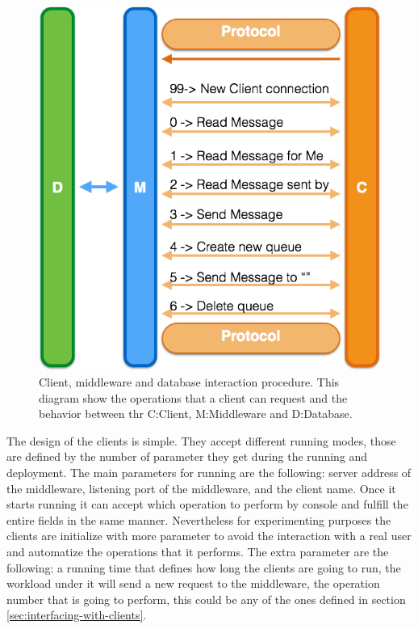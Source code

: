 \begin{figure}[h!]
	\centering
	\includegraphics[scale=0.3]{prtocol.png}
	\caption{Client, middleware and database interaction procedure. This diagram show the operations that a client can request and the behavior between thr C:Client, M:Middleware and D:Database.}
	\label{interaction}
\end{figure}
The design of the clients is simple. They accept different running modes, those are defined by the number of parameter they get during the running and deployment. The main parameters for running are the following: server address of the middleware, listening port of the middleware, and the client name. Once it starts running it can accept which operation to perform by console and fulfill the entire fields in the same manner. Nevertheless for experimenting purposes the clients are initialize with more parameter to avoid the interaction with a real user and automatize the operations that it performs. The extra parameter are the following: a running time that defines how long the clients are going to run, the workload under it will send a new request to the middleware, the operation number that is going to perform, this could be any of the ones defined in section \ref{sec:interfacing-with-clients}.\\

